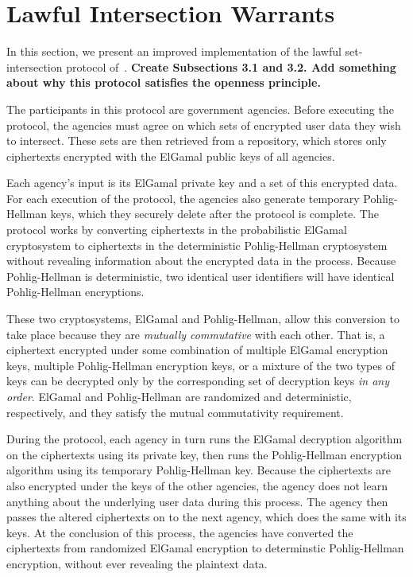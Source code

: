 \section{Lawful Intersection Warrants}\label{sec-intersection}
In this section, we present an improved implementation of the lawful
set-intersection protocol of~\cite{sff-foci2014}. 
{\bf Create Subsections 3.1 and 3.2.  Add something about why this protocol
satisfies the openness principle.}

The participants in this
protocol are government agencies. Before executing the protocol, the 
agencies must agree on which sets of encrypted user data they wish to 
intersect. These sets are then retrieved from a repository, which stores 
only ciphertexts encrypted with the ElGamal public keys of all agencies.

Each agency's input is its ElGamal private key and a set of this encrypted data. For each execution of the protocol, the agencies also generate temporary 
Pohlig-Hellman keys, which they securely delete after the protocol is complete. 
The protocol works by converting ciphertexts in the probabilistic ElGamal 
cryptosystem to ciphertexts in the deterministic Pohlig-Hellman 
cryptosystem without revealing information about the encrypted data in the 
process. Because Pohlig-Hellman is deterministic, two identical user 
identifiers will have identical Pohlig-Hellman encryptions.

These two cryptosystems, ElGamal and Pohlig-Hellman, allow this 
conversion to take place because they are \emph{mutually commutative} with 
each other. That is, a ciphertext encrypted under some combination of 
multiple ElGamal encryption keys, multiple Pohlig-Hellman encryption keys, 
or a mixture of the two types of keys can be decrypted only by the 
corresponding set of decryption keys \emph{in any order}. ElGamal and 
Pohlig-Hellman are randomized and deterministic, respectively, and they 
satisfy the mutual commutativity requirement.

During the protocol, each agency in turn runs the ElGamal decryption 
algorithm on the ciphertexts using its private key, then runs the 
Pohlig-Hellman encryption algorithm using its temporary Pohlig-Hellman key. 
Because the ciphertexts are also encrypted under the keys of the other 
agencies, the agency does not learn anything about the underlying user 
data during this process. The agency then passes the altered ciphertexts on 
to the next agency, which does the same with its keys. At the conclusion of 
this process, the agencies have converted the ciphertexts from randomized 
ElGamal encryption to determinstic Pohlig-Hellman encryption, without 
ever revealing the plaintext data.

